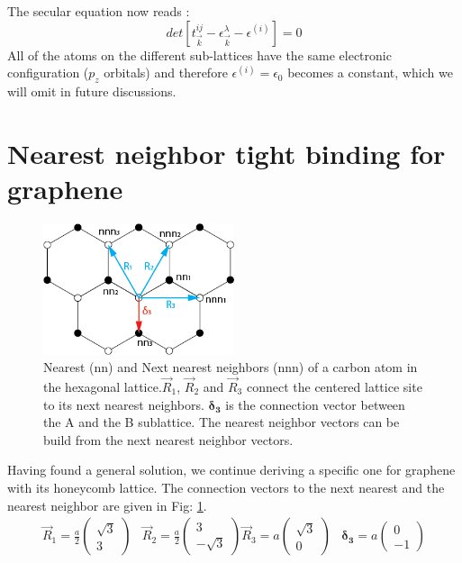		The secular equation now reads :
		\begin{equation}
			\label{eq:generalTightBindingSolution}
			det[t_\vec k^{ij} - \epsilon_\vec k ^\lambda - \epsilon^{(i)}] = 0
		\end{equation}
		All of the atoms on the different sub-lattices have the same electronic configuration ($p_z$ orbitals) and therefore $\epsilon^{(i)} = \epsilon_0$ becomes a constant, which we will omit in future discussions.
					
	\section{Nearest neighbor tight binding for graphene}
		\begin{figure}[h]
			\centering
			\includegraphics[width=0.5\textwidth]{figures/TightBinding/tightBinding.png}
			\caption{Nearest (nn) and Next nearest neighbors (nnn) of a carbon atom in the hexagonal lattice.$\vec R_1$, $\vec R_2$ and $\vec R_3$ connect the centered lattice site to its next nearest neighbors. $\boldsymbol{\delta_3}$ is the connection vector between the A and the B sublattice. The nearest neighbor vectors can be build from the next nearest neighbor vectors.}
			\label{fig:tighBindingHoneycomb}
		\end{figure}
		Having found a general solution, we continue deriving a specific one for graphene with its honeycomb lattice. The connection vectors to the next nearest and the nearest neighbor are given in Fig: \ref{fig:tighBindingHoneycomb}.
		\begin{align}
			\label{eq:tightBindingVectors}
			\vec R_1 = \frac{a}{2} 
			\begin{pmatrix} 
				\sqrt{3} \\
			 	3
			 \end{pmatrix} & 
			 \vec R_2 = \frac{a}{2} 
			 \begin{pmatrix} 
			 	3 \\
			 	- \sqrt{3}
			 \end{pmatrix}
			 \vec R_3 = a 
			 \begin{pmatrix} 
			 	\sqrt{3} \\ 
			 	0
			 \end{pmatrix} &
			 \boldsymbol{\delta_3} = a \begin{pmatrix} 0 \\ -1\end{pmatrix}
		\end{align}
